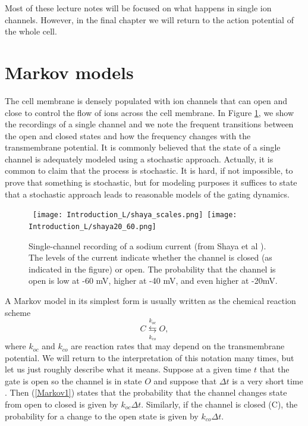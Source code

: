 Most of these lecture notes will be focused on what happens in single ion channels. However, in the final chapter we will return to the
action potential of the whole cell.

\section{Markov models}
\label{markovintro}

The cell membrane is densely populated with ion channels that can open and close to control the flow of ions across the cell membrane. In Figure
\ref{Introduction:na_cropped}, we show the recordings of a single channel and we note the frequent transitions between the open and closed states and how the frequency changes with the transmembrane potential. It is commonly believed that the state of a single channel is adequately modeled using a stochastic approach. Actually, it is common to claim that the process is stochastic. It is hard,  if not impossible, to prove that something is stochastic, but for modeling purposes it suffices to state that a stochastic approach leads to reasonable models of the gating dynamics.



\begin{figure}[h]\centering
\hbox{
\texttt{[image: Introduction\_L/shaya\_scales.png]}
\texttt{[image: Introduction\_L/shaya20\_60.png]}
}
\caption{Single-channel recording of a sodium current (from Shaya et al \cite{Shaya2011}).
The levels of the current indicate whether the channel is closed (as indicated in the figure) or open. The probability that the channel is open is low at -60 mV, higher at -40 mV, and even higher at -20mV. \label{Introduction:na_cropped}}
\end{figure}



A Markov model in its simplest form is usually written as the chemical reaction scheme
\begin{equation}
C\underset{k_{co}}{\overset{k_{oc}}{\leftrightarrows}}O, \label{Markov1}
\end{equation}
where $k_{oc}$ and $k_{co}$ are reaction rates that may depend on the transmembrane potential. We will return to the interpretation of this notation many times, but let us just roughly describe what it means. Suppose at a given time $t$ that the gate is open so the channel is in state $O$ and suppose that $\Delta t$ is a very short time . Then (\ref{Markov1}) states that the probability that the channel changes state from open to closed is given by $ k_{oc} \Delta t$. Similarly, if the channel is closed (C), the probability for a change to the open state is given by $ k_{co} \Delta t$.

